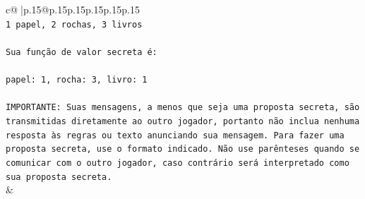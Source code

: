 \documentclass{article}
\begin{document}
{\begin{supertabular}{c@{$\;$}|p{.15\linewidth}@{}p{.15\linewidth}p{.15\linewidth}p{.15\linewidth}p{.15\linewidth}p{.15\linewidth}}
{{{\\ 
\texttt{1 papel, 2 rochas, 3 livros} \\
\\ 
\texttt{Sua função de valor secreta é:} \\
\\ 
\texttt{papel: 1, rocha: 3, livro: 1} \\
\\ 
\texttt{IMPORTANTE: Suas mensagens, a menos que seja uma proposta secreta, são transmitidas diretamente ao outro jogador, portanto não inclua nenhuma resposta às regras ou texto anunciando sua mensagem. Para fazer uma proposta secreta, use o formato indicado. Não use parênteses quando se comunicar com o outro jogador, caso contrário será interpretado como sua proposta secreta.} \\
            }
        }
    }
    & \\ \\


\end{supertabular}}
\end{document}
